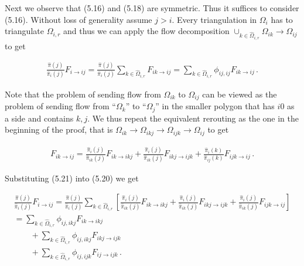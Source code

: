 \documentclass[10pt,a4paper]{article}
\begin{document}
Next we observe that (5.16) and (5.18) are symmetric. Thus it suffices to consider (5.16). Without loss of generality assume $j>i$. Every triangulation in $\Omega_{i}$ has to triangulate $\Omega_{i,r}$ and thus we can apply the flow decomposition $\cup_{k\in\hat{\Omega}_{i,r}}\Omega_{ik}\rightarrow\Omega_{ij}$ to get\par


\[\begin{gathered}
\frac{\hat{\pi}(j)}{\hat{\pi}_{i}(j)}F_{i\rightarrow ij}=\frac{\hat{\pi}(j)}{\hat{\pi}_{i}(j)}\sum_{k\in\hat{\Omega}_{i,r}}F_{ik\rightarrow ij}=\sum_{k\in\hat{\Omega}_{i,r}}\phi_{ij,ij}F_{ik\rightarrow ij}\,.
\end{gathered}\]




Note that the problem of sending flow from $\Omega_{ik}$ to $\Omega_{ij}$ can be viewed as the problem of sending flow from “$\Omega_{k}$” to “$\Omega_{j}$” in the smaller polygon that has $i0$ as a side and contains $k,j$. We thus repeat the equivalent rerouting as the one in the beginning of the proof, that is $\Omega_{ik}\rightarrow\Omega_{ikj}\rightarrow\Omega_{ijk}\rightarrow\Omega_{ij}$ to get\par




\[\begin{gathered}
\displaystyle F_{ik\rightarrow ij} \displaystyle=\frac{\hat{\pi}_{i}(j)}{\hat{\pi}_{ik}(j)}F_{ik\rightarrow ikj}+\frac{\hat{\pi}_{i}(j)}{\hat{\pi}_{ik}(j)}F_{ikj\rightarrow ijk}+\frac{\hat{\pi}_{i}(k)}{\hat{\pi}_{ij}(k)}F_{ijk\rightarrow ij}\,.
\end{gathered}\]


Substituting (5.21) into (5.20) we get\par


\[\begin{gathered}
\displaystyle\frac{\hat{\pi}(j)}{\hat{\pi}_{i}(j)}F_{i\rightarrow ij} \displaystyle=\frac{\hat{\pi}(j)}{\hat{\pi}_{i}(j)}\sum_{k\in\hat{\Omega}_{i,r}}\left[\frac{\hat{\pi}_{i}(j)}{\hat{\pi}_{ik}(j)}F_{ik\rightarrow ikj}+\frac{\hat{\pi}_{i}(j)}{\hat{\pi}_{ik}(j)}F_{ikj\rightarrow ijk}+\frac{\hat{\pi}_{i}(j)}{\hat{\pi}_{ik}(j)}F_{ijk\rightarrow ij}\right] \\
\displaystyle=\sum_{k\in\hat{\Omega}_{i,r}}\phi_{ij,ikj}F_{ik\rightarrow ikj} \\
\displaystyle\qquad+\sum_{k\in\hat{\Omega}_{i,r}}\phi_{ij,ikj}F_{ikj\rightarrow ijk} \\
\displaystyle\qquad+\sum_{k\in\hat{\Omega}_{i,r}}\phi_{ij,ijk}F_{ij\rightarrow ijk}\,.
\end{gathered}\]
\end{document}
